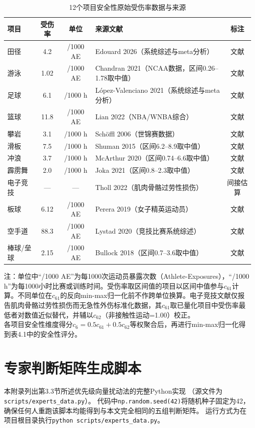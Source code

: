 \documentclass[twoside]{CUGThesis}
\begin{document}
\begin{table}[htbp]
\centering
\small
\caption{12个项目安全性原始受伤率数据与来源}
\label{tab:app_safety_source}
\begin{tabularx}{\textwidth}{lcc>{\raggedright\arraybackslash}Xc}
\toprule
项目 & 受伤率 & 单位 & 来源文献 & 标注 \\
\midrule
田径 & 4.2 & /1000 AE & Edouard 2026（系统综述与meta分析）\cite{Edouard2026} & 文献 \\
游泳 & 1.02 & /1000 AE & Chandran 2021（NCAA数据，区间0.26--1.78取中值）\cite{Chandran2021} & 文献 \\
足球 & 6.1 & /1000 h & López-Valenciano 2021（系统综述与meta分析）\cite{LopezValenciano2021} & 文献 \\
篮球 & 11.8 & /1000 AE & Lian 2022（NBA/WNBA综合）\cite{Lian2022} & 文献 \\
攀岩 & 3.1 & /1000 h & Schöffl 2006（世锦赛数据）\cite{Schoffl2006} & 文献 \\
滑板 & 7.5 & /1000 h & Shuman 2015（区间6.2--8.9取中值） & 文献 \\
冲浪 & 3.7 & /1000 h & McArthur 2020（区间0.74--6.6取中值）\cite{McArthur2020} & 文献 \\
霹雳舞 & 2.0 & /1000 h & Joka 2021（区间0.8--2.3取中值） & 文献 \\
电子竞技 & — & — & Tholl 2022（肌肉骨骼过劳性损伤）\cite{Tholl2022} & 间接估算 \\
板球 & 6.12 & /1000 AE & Perera 2019（女子精英运动员）\cite{Perera2019} & 文献 \\
空手道 & 88.3 & /1000 AE & Lystad 2020（竞技比赛系统综述）\cite{Lystad2020} & 文献 \\
棒球/垒球 & 2.15 & /1000 AE & Bullock 2018（区间0.7--3.6取中值）\cite{Bullock2018} & 文献 \\
\bottomrule
\end{tabularx}

\smallskip
\footnotesize 注：单位中``/1000 AE''为每1000次运动员暴露次数（Athlete-Exposures），``/1000 h''为每1000小时比赛或训练时间。受伤率取区间值的项目以区间中值参与$c_{61}$计算。不同单位在$c_{61}$的反向min-max归一化前不作跨单位换算。电子竞技文献仅报告肌肉骨骼过劳性损伤而无急性外伤标准化数据，其$c_{61}$取已量化项目中受伤率最低者对数值近似替代，并辅以$c_{62}$（非接触性运动=1.00）校正。\\
各项目安全性维度得分$c_6 = 0.5 c_{61} + 0.5 c_{62}$等权聚合后，再进行min-max归一化得到表4.1中的安全性评分。
\end{table}

\section{专家判断矩阵生成脚本}
\label{app:experts_code}

本附录列出第3.3节所述优先级向量扰动法的完整Python实现
（源文件为\texttt{scripts/experts\_data.py}）。
代码中\texttt{np.random.seed(42)}将随机种子固定为42，
确保任何人重跑该脚本均能得到与本文完全相同的五组判断矩阵。
运行方式为在项目根目录执行\texttt{python scripts/experts\_data.py}。


\end{document}
